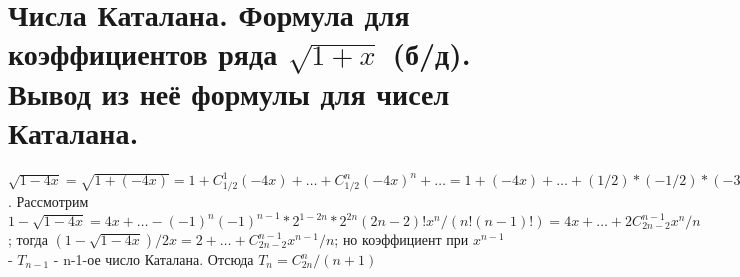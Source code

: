 \section{Числа Каталана. Формула для коэффициентов ряда $\sqrt{1+x}$ (б/д). Вывод из неё формулы для чисел Каталана.}
$\sqrt{1-4x} = \sqrt{1+(-4x)} = 1 + C_{1/2}^1(-4x) + \dots + C_{1/2}^n(-4x)^n + \dots = 1 + (-4x) + \dots + (1/2)*(-1/2)*(-3/2)*\dots*((3-2n)/2)(-4x)^n/n! = 1 -4x + \dots + (-1)^{n-1}*2^{-n}*1*3*\dots*(2n-3)*2*4*\dots*(2n-2)(-4x)^n/(n!*2*4*\dots*(2n-2)) = 1 -4x + \dots + (-1)^{n-1}*2^{-n}*2^{1-n}(2n-2)!(-4x)^n/(n!(n-1)!)$. Рассмотрим $1-\sqrt{1-4x} = 4x + \dots - (-1)^n(-1)^{n-1}*2^{1-2n}*2^{2n}(2n-2)!x^n/(n!(n-1)!) = 4x + \dots + 2C_{2n-2}^{n-1}x^n/n$; тогда $(1-\sqrt{1-4x})/2x = 2 + \dots + C_{2n-2}^{n-1}x^{n-1}/n $; но коэффициент при $x^{n-1}$ - $T_{n-1}$ - n-1-ое число Каталана. Отсюда $T_n = C_{2n}^n/(n+1)$